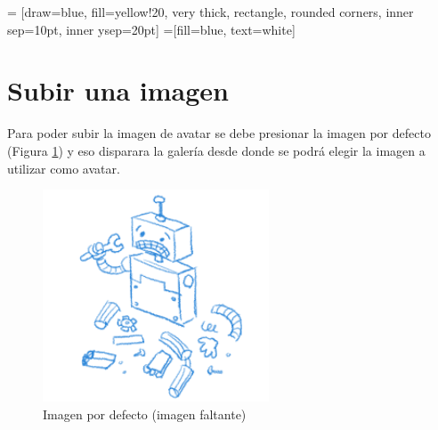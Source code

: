 \documentclass[10pt,letterpaper,extrafontsizes]{memoir}
\begin{document}
\begin{center}
 = [draw=blue, fill=yellow!20, very thick,
    rectangle, rounded corners, inner sep=10pt, inner ysep=20pt]
 =[fill=blue, text=white]
\end{center}
%

\section{Subir una imagen}

Para poder subir la imagen de avatar se debe presionar la imagen por defecto (Figura \ref{fig:notfound}) y eso disparara la galería desde donde se podrá elegir la imagen a utilizar como avatar.

\begin{figure}[H]
    \centering
\includegraphics[width=0.6\textwidth]{graficos/imagenes/not_found}
    \caption{Imagen por defecto (imagen faltante)}
    \label{fig:notfound}
\end{figure}
\end{document}
